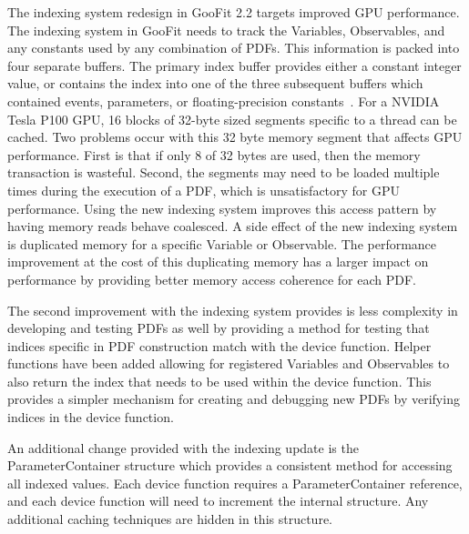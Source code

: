\documentclass{webofc}
\begin{document}
The indexing system redesign in GooFit 2.2 targets improved GPU performance. The indexing system in GooFit needs to track the Variables, Observables, and any constants used by any combination of PDFs. This information is packed into four separate buffers. The primary index buffer provides either a constant integer value, or contains the index into one of the three subsequent buffers which contained events, parameters, or floating-precision constants~\cite{lib:GooFit:main}. For a NVIDIA Tesla P100 GPU, 16 blocks of 32-byte sized segments specific to a thread can be cached. Two problems occur with this 32 byte memory segment that affects GPU performance. First is that if only 8 of 32 bytes are used, then the memory transaction is wasteful. Second, the segments may need to be loaded multiple times during the execution of a PDF, which is unsatisfactory for GPU performance. Using the new indexing system improves this access pattern by having memory reads behave coalesced. A side effect of the new indexing system is duplicated memory for a specific Variable or Observable. The performance improvement at the cost of this duplicating memory has a larger impact on performance by providing better memory access coherence for each PDF.

The second improvement with the indexing system provides is less complexity in developing and testing PDFs as well by providing a method for testing that indices specific in PDF construction match with the device function. Helper functions have been added allowing for registered Variables and Observables to also return the index that needs to be used within the device function. This provides a simpler mechanism for creating and debugging new PDFs by verifying indices in the device function. 

An additional change provided with the indexing update is the ParameterContainer structure which provides a consistent method for accessing all indexed values. Each device function requires a ParameterContainer reference, and each device function will need to increment the internal structure. Any additional caching techniques are hidden in this structure.
\end{document}
